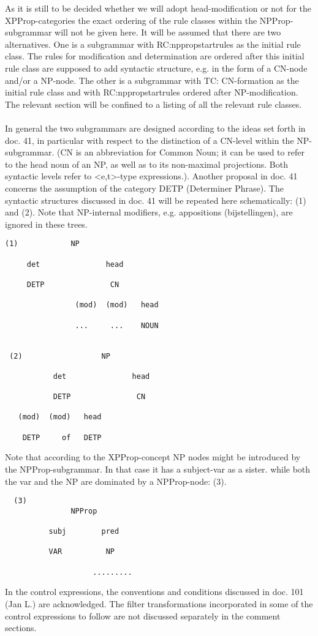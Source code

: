 As it is still to be decided whether we will adopt head-modification or not for
the XPProp-categories the exact ordering of the rule classes within the
NPProp-subgrammar will not be given here. It will be assumed that there are two
alternatives. One is a subgrammar with RC:nppropstartrules as the initial rule
class. The rules for modification and determination are ordered after this
initial rule class are supposed to add syntactic structure, e.g. in the form of
a CN-node and/or a NP-node. The other is a subgrammar with TC: CN-formation
as the initial rule class and with RC:nppropstartrules ordered after
NP-modification. The relevant section will be confined to a listing of all the
relevant rule classes. 
\\ \\ 
In general the two subgrammars are designed according to the ideas set forth in
doc. 41, in particular with respect to the distinction of a CN-level within the
NP-subgrammar. (CN is an abbreviation for Common Noun; it can be used to refer
to the head noun of an NP, as well as to its non-maximal projections. Both
syntactic levels refer to <e,t>-type expressions.). Another proposal in doc. 41
concerns the assumption of the category DETP (Determiner Phrase). The syntactic
structures discussed in doc. 41 will be repeated here schematically: (1) and
(2). Note that NP-internal modifiers, e.g. appositions (bijstellingen), are
ignored in these trees.
\newpage
\begin{verbatim}
(1)            NP

     det               head

     DETP               CN

                (mod)  (mod)   head

                ...     ...    NOUN 


 (2)                  NP

           det               head

           DETP               CN

   (mod)  (mod)   head

    DETP     of   DETP

\end{verbatim}
Note that according to the XPProp-concept NP nodes might be introduced by the
NPProp-subgrammar. In that case it has a subject-var as a sister. while both
the var and the NP are dominated by a NPProp-node: (3). 

\begin{verbatim}
  (3)
               NPProp

          subj        pred

          VAR          NP

                    .........

\end{verbatim}
In the control expressions, the conventions and conditions discussed in doc.
101 (Jan L.) are acknowledged. The filter transformations incorporated in some
of the control expressions to follow are not discussed separately in the
comment sections.

